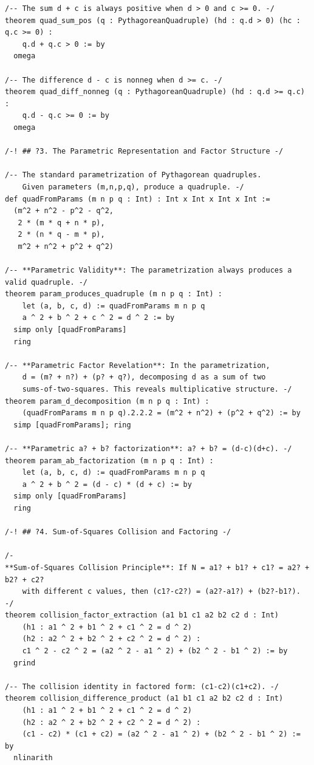 \documentclass[11pt,twoside,openright]{book}
\theoremstyle{definition}
\theoremstyle{remark}
\begin{document}
\begin{lstlisting}[style=lean]
/-- The sum d + c is always positive when d > 0 and c >= 0. -/
theorem quad_sum_pos (q : PythagoreanQuadruple) (hd : q.d > 0) (hc : q.c >= 0) :
    q.d + q.c > 0 := by
  omega

/-- The difference d - c is nonneg when d >= c. -/
theorem quad_diff_nonneg (q : PythagoreanQuadruple) (hd : q.d >= q.c) :
    q.d - q.c >= 0 := by
  omega

/-! ## ?3. The Parametric Representation and Factor Structure -/

/-- The standard parametrization of Pythagorean quadruples.
    Given parameters (m,n,p,q), produce a quadruple. -/
def quadFromParams (m n p q : Int) : Int x Int x Int x Int :=
  (m^2 + n^2 - p^2 - q^2,
   2 * (m * q + n * p),
   2 * (n * q - m * p),
   m^2 + n^2 + p^2 + q^2)

/-- **Parametric Validity**: The parametrization always produces a valid quadruple. -/
theorem param_produces_quadruple (m n p q : Int) :
    let (a, b, c, d) := quadFromParams m n p q
    a ^ 2 + b ^ 2 + c ^ 2 = d ^ 2 := by
  simp only [quadFromParams]
  ring

/-- **Parametric Factor Revelation**: In the parametrization,
    d = (m? + n?) + (p? + q?), decomposing d as a sum of two
    sums-of-two-squares. This reveals multiplicative structure. -/
theorem param_d_decomposition (m n p q : Int) :
    (quadFromParams m n p q).2.2.2 = (m^2 + n^2) + (p^2 + q^2) := by
  simp [quadFromParams]; ring

/-- **Parametric a? + b? factorization**: a? + b? = (d-c)(d+c). -/
theorem param_ab_factorization (m n p q : Int) :
    let (a, b, c, d) := quadFromParams m n p q
    a ^ 2 + b ^ 2 = (d - c) * (d + c) := by
  simp only [quadFromParams]
  ring

/-! ## ?4. Sum-of-Squares Collision and Factoring -/

/-
**Sum-of-Squares Collision Principle**: If N = a1? + b1? + c1? = a2? + b2? + c2?
    with different c values, then (c1?-c2?) = (a2?-a1?) + (b2?-b1?).
-/
theorem collision_factor_extraction (a1 b1 c1 a2 b2 c2 d : Int)
    (h1 : a1 ^ 2 + b1 ^ 2 + c1 ^ 2 = d ^ 2)
    (h2 : a2 ^ 2 + b2 ^ 2 + c2 ^ 2 = d ^ 2) :
    c1 ^ 2 - c2 ^ 2 = (a2 ^ 2 - a1 ^ 2) + (b2 ^ 2 - b1 ^ 2) := by
  grind

/-- The collision identity in factored form: (c1-c2)(c1+c2). -/
theorem collision_difference_product (a1 b1 c1 a2 b2 c2 d : Int)
    (h1 : a1 ^ 2 + b1 ^ 2 + c1 ^ 2 = d ^ 2)
    (h2 : a2 ^ 2 + b2 ^ 2 + c2 ^ 2 = d ^ 2) :
    (c1 - c2) * (c1 + c2) = (a2 ^ 2 - a1 ^ 2) + (b2 ^ 2 - b1 ^ 2) := by
  nlinarith


\end{lstlisting}
\end{document}
